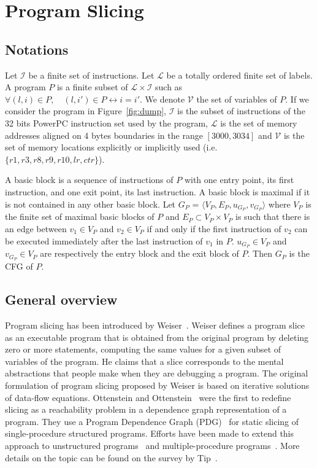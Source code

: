 \section{Program Slicing}
\label{sec:slicing}

  \subsection{Notations}
  \label{subsec:slicing-notations}

  Let $\mathcal{I}$ be a finite set of instructions. Let $\mathcal{L}$ be a
  totally ordered finite set of labels. A program $P$ is a finite subset of
  $\mathcal{L} \times \mathcal{I}$ such as $\forall (l,i) \in P,\quad (l,i') \in
  P \leftrightarrow i = i'$. We denote $\mathcal{V}$ the set of variables of
  $P$. If we consider the program in Figure~\ref{fig:dump}, $\mathcal{I}$ is the
  subset of instructions of the 32 bits PowerPC instruction set used by the
  program, $\mathcal{L}$ is the set of memory addresses aligned on 4 bytes
  boundaries in the range $[3000, 3034]$ and $\mathcal{V}$ is the set of memory
  locations explicitly or implicitly used (i.e. $\{r1, r3, r8, r9, r10, lr,
  ctr\}$).

  A basic block is a sequence of instructions of $P$ with one entry point, its
  first instruction, and one exit point, its last instruction. A basic block is
  maximal if it is not contained in any other basic block. Let $G_P$ = $\langle
  V_P, E_P, u_{G_P}, v_{G_P} \rangle$ where $V_P$ is the finite set of maximal
  basic blocks of $P$ and $E_P \subset V_P \times V_P$ is such that there is an
  edge between $v_1 \in V_P$ and $v_2 \in V_P$ if and only if the first
  instruction of $v_2$ can be executed immediately after the last instruction of
  $v_1$ in $P$. $u_{G_P} \in V_P$ and $v_{G_P} \in V_P$ are respectively the
  entry block and the exit block of $P$. Then $G_P$ is the CFG of $P$.

  \subsection{General overview}
  \label{subsec:slicing-overview}

  Program slicing has been introduced by Weiser~\cite{Wei81}. Weiser defines
  a program slice as an executable program that is obtained from the original
  program by deleting zero or more statements, computing the same values for a
  given subset of variables of the program. He claims that a slice corresponds
  to the mental abstractions that people make when they are debugging a
  program. The original formulation of program slicing proposed by Weiser is
  based on iterative solutions of data-flow equations. Ottenstein and
  Ottenstein~\cite{OO84} were the first to redefine slicing as a reachability
  problem in a dependence graph representation of a program. They use a Program
  Dependence Graph (PDG)~\cite{FOW87} for static slicing of single-procedure
  structured programs. Efforts have been made to extend this approach to
  unstructured programs~\cite{Agr94,KJL03} and multiple-procedure
  programs~\cite{HSR90,KJL03}. More details on the topic can be found on the
  survey by Tip~\cite{Tip95}.
  
